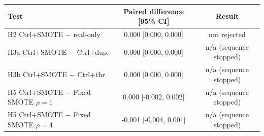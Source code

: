\begin{tabular}{lcc}
\toprule
Test & Paired difference [95\% CI] & Result \\
\midrule
H2 Ctrl+SMOTE $-$ real-only & 0.000 [0.000, 0.000] & not rejected \\
H3a Ctrl+SMOTE $-$ Ctrl+dup. & 0.000 [0.000, 0.000] & n/a (sequence stopped) \\
H3b Ctrl+SMOTE $-$ Ctrl+thr. & 0.000 [0.000, 0.000] & n/a (sequence stopped) \\
H5 Ctrl+SMOTE $-$ Fixed SMOTE $\rho{=}1$ & 0.000 [-0.002, 0.002] & n/a (sequence stopped) \\
H5 Ctrl+SMOTE $-$ Fixed SMOTE $\rho{=}4$ & -0.001 [-0.004, 0.001] & n/a (sequence stopped) \\
\bottomrule
\end{tabular}
